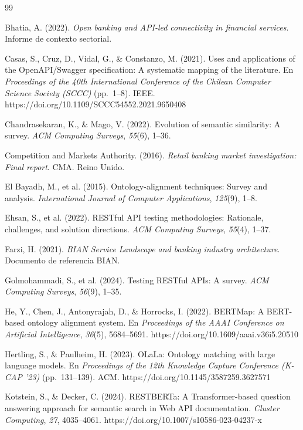 \renewcommand{\bibname}{Referencias}
\begin{thebibliography}{99}

Bhatia, A. (2022).
\textit{Open banking and API-led connectivity in financial services}.
Informe de contexto sectorial.

Casas, S., Cruz, D., Vidal, G., \& Constanzo, M. (2021).
Uses and applications of the OpenAPI/Swagger specification: A systematic mapping of the literature.
En \textit{Proceedings of the 40th International Conference of the Chilean Computer Science Society (SCCC)} (pp.~1--8). IEEE.
https://doi.org/10.1109/SCCC54552.2021.9650408

Chandrasekaran, K., \& Mago, V. (2022).
Evolution of semantic similarity: A survey.
\textit{ACM Computing Surveys}, \textit{55}(6), 1--36.

Competition and Markets Authority. (2016).
\textit{Retail banking market investigation: Final report}.
CMA. Reino Unido.

El Bayadh, M., et al. (2015).
Ontology-alignment techniques: Survey and analysis.
\textit{International Journal of Computer Applications}, \textit{125}(9), 1--8.

Ehsan, S., et al. (2022).
RESTful API testing methodologies: Rationale, challenges, and solution directions.
\textit{ACM Computing Surveys}, \textit{55}(4), 1--37.

Farzi, H. (2021).
\textit{BIAN Service Landscape and banking industry architecture}.
Documento de referencia BIAN.

Golmohammadi, S., et al. (2024).
Testing RESTful APIs: A survey.
\textit{ACM Computing Surveys}, \textit{56}(9), 1--35.

He, Y., Chen, J., Antonyrajah, D., \& Horrocks, I. (2022).
BERTMap: A BERT-based ontology alignment system.
En \textit{Proceedings of the AAAI Conference on Artificial Intelligence}, \textit{36}(5), 5684--5691.
https://doi.org/10.1609/aaai.v36i5.20510

Hertling, S., \& Paulheim, H. (2023).
OLaLa: Ontology matching with large language models.
En \textit{Proceedings of the 12th Knowledge Capture Conference (K-CAP '23)} (pp.~131--139). ACM.
https://doi.org/10.1145/3587259.3627571

Kotstein, S., \& Decker, C. (2024).
RESTBERTa: A Transformer-based question answering approach for semantic search in Web API documentation.
\textit{Cluster Computing}, \textit{27}, 4035--4061.
https://doi.org/10.1007/s10586-023-04237-x


\end{thebibliography}
